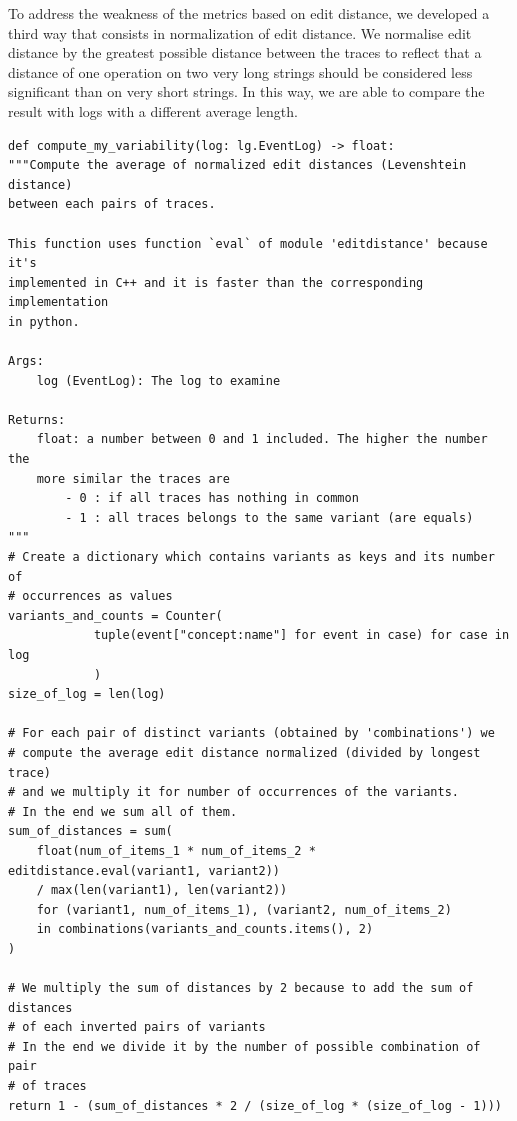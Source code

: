 \documentclass[12pt]{article}
\newenvironment{code}{\captionsetup{type=listing}}{}
\begin{document}
To address the weakness of the metrics based on edit distance, we developed a third way that consists in normalization of edit distance.  We normalise edit distance by the greatest possible distance between the traces to reflect that a distance of one operation on two very long strings should be considered less significant than on very short strings. In this way, we are able to compare the result with logs with a different average length.
\begin{code}
	\label{code:code3}
	\begin{verbatim}
def compute_my_variability(log: lg.EventLog) -> float:
"""Compute the average of normalized edit distances (Levenshtein distance)
between each pairs of traces.

This function uses function `eval` of module 'editdistance' because it's
implemented in C++ and it is faster than the corresponding implementation
in python.

Args:
	log (EventLog): The log to examine

Returns:
	float: a number between 0 and 1 included. The higher the number the
	more similar the traces are
		- 0 : if all traces has nothing in common
		- 1 : all traces belongs to the same variant (are equals)
"""
# Create a dictionary which contains variants as keys and its number of
# occurrences as values
variants_and_counts = Counter(
			tuple(event["concept:name"] for event in case) for case in log
			)
size_of_log = len(log)

# For each pair of distinct variants (obtained by 'combinations') we
# compute the average edit distance normalized (divided by longest trace)
# and we multiply it for number of occurrences of the variants.
# In the end we sum all of them.
sum_of_distances = sum(
	float(num_of_items_1 * num_of_items_2 * editdistance.eval(variant1, variant2))
	/ max(len(variant1), len(variant2))
	for (variant1, num_of_items_1), (variant2, num_of_items_2)
	in combinations(variants_and_counts.items(), 2)
)

# We multiply the sum of distances by 2 because to add the sum of distances
# of each inverted pairs of variants
# In the end we divide it by the number of possible combination of pair
# of traces
return 1 - (sum_of_distances * 2 / (size_of_log * (size_of_log - 1)))
	\end{verbatim}
\end{code}
\end{document}
